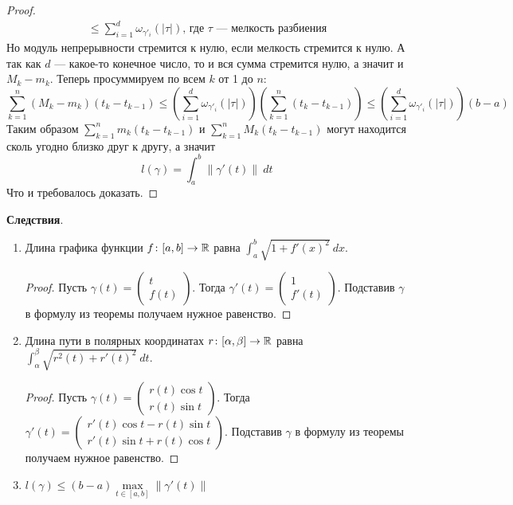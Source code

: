 \begin{proof}
\begin{equation*}
\begin{gathered}
      \leq \sum_{i = 1}^{d} \omega_{\gamma'_{i}}(|\tau|)\text{, где } \tau\text{ --- мелкость разбиения}
    \end{gathered}
  \end{equation*}
  Но модуль непрерывности стремится к нулю, если мелкость стремится к нулю. А так как $d$ --- какое-то конечное число, то и вся сумма стремится нулю, а значит и $M_k - m_k$. Теперь просуммируем по всем $k$ от 1 до $n$:
  \begin{equation*}
    \sum\limits_{k = 1}^{n} (M_k - m_k)(t_k - t_{k - 1}) \leq
    \left(\sum_{i = 1}^{d} \omega_{\gamma'_{i}}(|\tau|)\right)\left(\sum\limits_{k = 1}^{n} (t_k - t_{k - 1})\right) \leq \left(\sum_{i = 1}^{d} \omega_{\gamma'_{i}}(|\tau|)\right)(b - a)
  \end{equation*}
  Таким образом $\sum\limits_{k =1}^{n} m_k(t_k - t_{k - 1})$ и $\sum\limits_{k =1}^{n} M_k(t_k - t_{k - 1})$ могут находится сколь угодно близко друг к другу, а значит
  \begin{equation*}
    l(\gamma) = \int_{a}^{b} \| \gamma'(t)\| \: dt
  \end{equation*}
  Что и требовалось доказать.
\end{proof}

\textbf{Следствия}.
\begin{enumerate}
  \item Длина графика функции $f\colon [a, b] \to \mathbb{R}$ равна $\int_{a}^{b} \sqrt{1 + f'(x)^2} \: dx$.
  \begin{proof}
    Пусть
    $
    \gamma(t) =
    \begin{pmatrix}
      t\\
      f(t)
    \end{pmatrix}
    $. Тогда
    $
    \gamma'(t) =
    \begin{pmatrix}
      1\\
      f'(t)
    \end{pmatrix}
    $. Подставив $\gamma$ в формулу из теоремы получаем нужное равенство.
  \end{proof}
  \item Длина пути в полярных координатах $r\colon [\alpha, \beta] \to \mathbb{R}$ равна $\int_{\alpha}^{\beta} \sqrt{r^2(t) + r'(t)^2} \: dt$.
  \begin{proof}
    Пусть
    $
    \gamma(t) =
    \begin{pmatrix}
      r(t)\cos t \\
      r(t)\sin t
    \end{pmatrix}
    $. Тогда
    $
    \gamma'(t) =
    \begin{pmatrix}
      r'(t)\cos t - r(t)\sin t \\
      r'(t)\sin t + r(t)\cos t
    \end{pmatrix}
    $. Подставив $\gamma$ в формулу из теоремы получаем нужное равенство.
  \end{proof}
  \item $l(\gamma) \leq (b - a)\max\limits_{t \in [a, b]} \| \gamma'(t) \|$
\end{enumerate}


